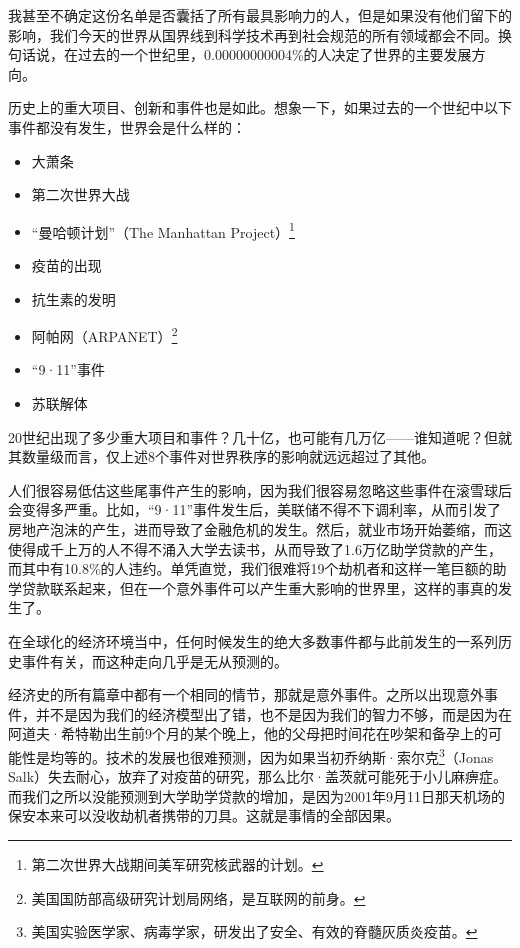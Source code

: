 我甚至不确定这份名单是否囊括了所有最具影响力的人，但是如果没有他们留下的影响，我们今天的世界从国界线到科学技术再到社会规范的所有领域都会不同。换句话说，在过去的一个世纪里，0.00000000004\%的人决定了世界的主要发展方向。

历史上的重大项目、创新和事件也是如此。想象一下，如果过去的一个世纪中以下事件都没有发生，世界会是什么样的：

\begin{itemize}

\item 大萧条

\item 第二次世界大战

\item “曼哈顿计划”（The Manhattan Project）\footnote{第二次世界大战期间美军研究核武器的计划。}

\item 疫苗的出现

\item 抗生素的发明

\item 阿帕网（ARPANET）\footnote{美国国防部高级研究计划局网络，是互联网的前身。}

\item “9·11”事件

\item 苏联解体

\end{itemize}

20世纪出现了多少重大项目和事件？几十亿，也可能有几万亿——谁知道呢？但就其数量级而言，仅上述8个事件对世界秩序的影响就远远超过了其他。

人们很容易低估这些尾事件产生的影响，因为我们很容易忽略这些事件在滚雪球后会变得多严重。比如，“9·11”事件发生后，美联储不得不下调利率，从而引发了房地产泡沫的产生，进而导致了金融危机的发生。然后，就业市场开始萎缩，而这使得成千上万的人不得不涌入大学去读书，从而导致了1.6万亿助学贷款的产生，而其中有10.8\%的人违约。单凭直觉，我们很难将19个劫机者和这样一笔巨额的助学贷款联系起来，但在一个意外事件可以产生重大影响的世界里，这样的事真的发生了。

在全球化的经济环境当中，任何时候发生的绝大多数事件都与此前发生的一系列历史事件有关，而这种走向几乎是无从预测的。

经济史的所有篇章中都有一个相同的情节，那就是意外事件。之所以出现意外事件，并不是因为我们的经济模型出了错，也不是因为我们的智力不够，而是因为在阿道夫·希特勒出生前9个月的某个晚上，他的父母把时间花在吵架和备孕上的可能性是均等的。技术的发展也很难预测，因为如果当初乔纳斯·索尔克\footnote{美国实验医学家、病毒学家，研发出了安全、有效的脊髓灰质炎疫苗。}（Jonas Salk）失去耐心，放弃了对疫苗的研究，那么比尔·盖茨就可能死于小儿麻痹症。而我们之所以没能预测到大学助学贷款的增加，是因为2001年9月11日那天机场的保安本来可以没收劫机者携带的刀具。这就是事情的全部因果。

